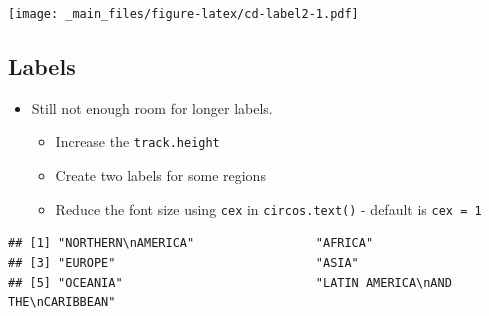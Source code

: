 \documentclass[
]{book}
\newenvironment{Shaded}{\begin{snugshade}}{\end{snugshade}}
\newcommand{\AttributeTok}[1]{\textcolor[rgb]{0.77,0.63,0.00}{#1}}
\newcommand{\DecValTok}[1]{\textcolor[rgb]{0.00,0.00,0.81}{#1}}
\newcommand{\FunctionTok}[1]{\textcolor[rgb]{0.00,0.00,0.00}{#1}}
\newcommand{\NormalTok}[1]{#1}
\newcommand{\SpecialCharTok}[1]{\textcolor[rgb]{0.00,0.00,0.00}{#1}}
\providecommand{\tightlist}{%
  \setlength{\itemsep}{0pt}\setlength{\parskip}{0pt}}
\begin{document}
\texttt{[image: \_main\_files/figure-latex/cd-label2-1.pdf]}

\hypertarget{labels-3}{%
\subsection{Labels}\label{labels-3}}

\begin{itemize}
\tightlist
\item
  Still not enough room for longer labels.

  \begin{itemize}
  \tightlist
  \item
    Increase the \texttt{track.height}
  \item
    Create two labels for some regions
  \item
    Reduce the font size using \texttt{cex} in \texttt{circos.text()} - default is \texttt{cex\ =\ 1}
  \end{itemize}
\end{itemize}

\begin{Shaded}
\end{Shaded}

\begin{verbatim}
## [1] "NORTHERN\nAMERICA"                 "AFRICA"                           
## [3] "EUROPE"                            "ASIA"                             
## [5] "OCEANIA"                           "LATIN AMERICA\nAND THE\nCARIBBEAN"
\end{verbatim}
\end{document}
